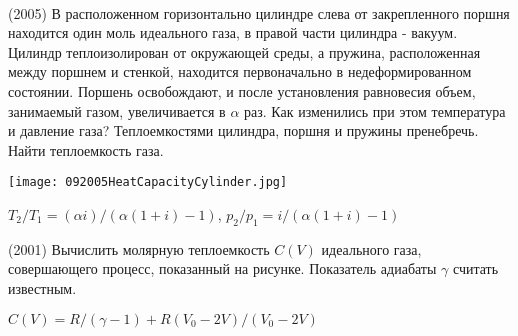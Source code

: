 \begin{ex}
\hspace{0pt} \\
\begin{minipage}{.65\textwidth}
(2005) В расположенном горизонтально цилиндре слева от закрепленного поршня находится один моль идеального газа, в правой части цилиндра - вакуум. Цилиндр теплоизолирован от окружающей среды, а пружина, расположенная между поршнем и стенкой, находится первоначально в недеформированном состоянии. Поршень освобождают, и после установления равновесия объем, занимаемый газом, увеличивается в $\alpha$ раз. Как изменились при этом температура и давление газа? Теплоемкостями цилиндра, поршня и пружины пренебречь. Найти теплоемкость газа.
\end{minipage}
\begin{minipage}{.35\textwidth}
\centering
\texttt{[image: 092005HeatCapacityCylinder.jpg]}
\end{minipage}
\begin{ans}
$T_2/T_1 = (\alpha i)/(\alpha (1+i) - 1)$, $p_2/p_1 = i/(\alpha (1+i) - 1)$
\end{ans}
\end{ex}

\begin{ex}
(2001) Вычислить молярную теплоемкость $C(V)$ идеального газа, совершающего процесс, показанный на рисунке. Показатель адиабаты $\gamma$ считать известным.
\begin{center}

\end{center}
\begin{ans}
$C(V) = R/(\gamma-1)+R(V_0-2V)/(V_0-2V)$
\end{ans}
\end{ex}